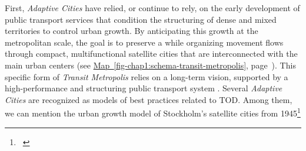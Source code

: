 \begin{refsegment}
First, \textsl{Adaptive Cities} have relied, or continue to rely, on the early development of public transport services that condition the structuring of dense and mixed territories to control urban growth. By anticipating this growth at the metropolitan scale, the goal is to preserve a  while organizing movement flows through compact, multifunctional satellite cities that are interconnected with the main urban centers (see \hyperref[fig-chap1:schema-transit-metropolis]{Map~\ref{fig-chap1:schema-transit-metropolis}}, page~\pageref{fig-chap1:schema-transit-metropolis}). This specific form of \textsl{Transit Metropolis} relies on a long-term vision, supported by a high-performance and structuring public transport system \textcolor{blue}{\autocite[132]{cervero_transit_1998}}. Several \textsl{Adaptive Cities} are recognized as models of best practices related to \acrshort{TOD}. Among them, we can mention the urban growth model of Stockholm's satellite cities from 1945\footnote{~
}
\end{refsegment}
